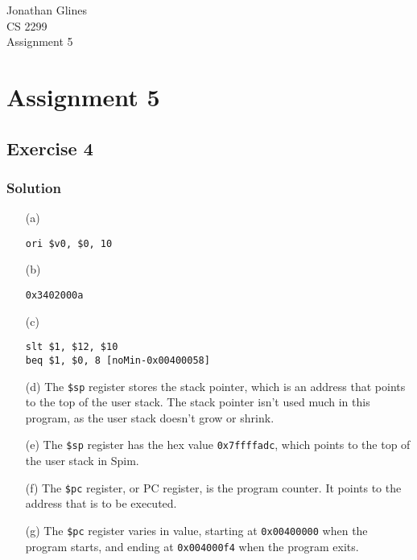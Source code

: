 \documentclass[12pt]{article}
\begin{document}
\begin{flushright}
{\Large Jonathan Glines \\
CS 2299 \\
Assignment 5 \\
}
\end{flushright}
\section*{Assignment 5}
\subsection*{Exercise 4}
\subsubsection*{Solution}
\begin{itemize}
\item[(a)] \begin{verbatim}ori $v0, $0, 10\end{verbatim}
\item[(b)] \begin{verbatim}0x3402000a\end{verbatim}
\item[(c)] \begin{verbatim}
slt $1, $12, $10
beq $1, $0, 8 [noMin-0x00400058]
\end{verbatim}
\item[(d)] The {\tt \$sp} register stores the stack pointer, which is an address that points to the top of the user stack. The stack pointer isn't used much in this program, as the user stack doesn't grow or shrink.
\item[(e)] The {\tt \$sp} register has the hex value {\tt 0x7ffffadc}, which points to the top of the user stack in Spim.
\item[(f)] The {\tt \$pc} register, or PC register, is the program counter. It points to the address that is to be executed.
\item[(g)] The {\tt \$pc} register varies in value, starting at {\tt 0x00400000} when the program starts, and ending at {\tt 0x004000f4} when the program exits.
\end{itemize}
\end{document}
